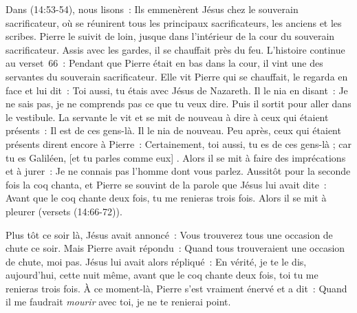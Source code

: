 Dans (14:53-54), nous lisons~:
 \og Ils emmenèrent Jésus chez le souverain sacrificateur,
 où se réunirent tous les principaux sacrificateurs,
 les anciens et les scribes.
 Pierre le suivit de loin, jusque dans l'intérieur de la cour
 du souverain sacrificateur.
 Assis avec les gardes, il se chauffait près du feu. \fg{}
 L'histoire continue au verset~66~:
 \og Pendant que Pierre était en bas dans la cour,
 il vint une des servantes du souverain sacrificateur.
 Elle vit Pierre qui se chauffait, le regarda en face et lui dit~:
 Toi aussi, tu étais avec Jésus de Nazareth. Il le nia en disant~:
 Je ne sais pas, je ne comprends pas ce que tu veux dire.
 Puis il sortit pour aller dans le vestibule.
 La servante le vit et se mit de nouveau à dire
 à ceux qui étaient présents~: Il est de ces gens-là.
 Il le nia de nouveau. Peu après, ceux qui étaient présents
 dirent encore à Pierre~: Certainement, toi aussi,
 tu es de ces gens-là ; car tu es Galiléen, [et tu parles comme eux] .
 Alors il se mit à faire des imprécations et à jurer~:
 Je ne connais pas l'homme dont vous parlez. Aussitôt pour la seconde fois
 la coq chanta, et Pierre se souvint de la parole que Jésus lui avait dite~:
 Avant que le coq chante deux fois, tu me renieras trois fois.
 Alors il se mit à pleurer \fg{} (versets (14:66-72)).

\begin{specialpar}{}
Plus tôt ce soir là, Jésus avait annoncé~:
 \og Vous trouverez tous une occasion de chute ce soir. \fg{}
 Mais Pierre avait répondu~:
 \og Quand tous trouveraient une occasion de chute, moi pas. \fg{}
 Jésus lui avait alors répliqué~:
 \og En vérité, je te le dis, aujourd'hui, cette nuit même,
 avant que le coq chante deux fois, toi tu me renieras trois fois. \fg{}
 À ce moment-là, Pierre s'est vraiment énervé et a dit~:
 \og Quand il me faudrait \emph{mourir} avec toi, je ne te renierai point. \fg{}
\end{specialpar}

